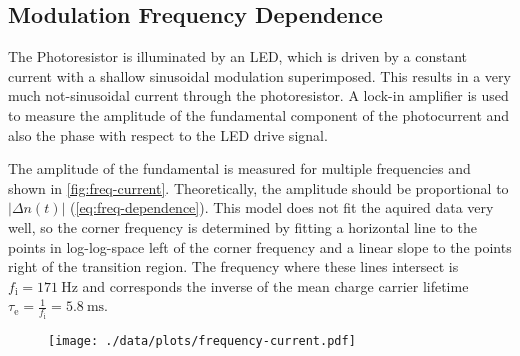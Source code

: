 \subsection{Modulation Frequency Dependence}
The Photoresistor is illuminated by an LED, which is driven by a constant current with a shallow sinusoidal modulation superimposed.
This results in a very much not-sinusoidal current through the photoresistor.
A lock-in amplifier is used to measure the amplitude of the fundamental component of the photocurrent and also the phase with respect to the LED drive signal.

The amplitude of the fundamental is measured for multiple frequencies and shown in \autoref{fig:freq-current}.
Theoretically, the amplitude should be proportional to $|\Delta n(t)|$ (\autoref{eq:freq-dependence}).
This model does not fit the aquired data very well, so the corner frequency is determined by fitting a horizontal line to the points in log-log-space left of the corner frequency and a linear slope to the points right of the transition region.
The frequency where these lines intersect is $f_\text{i} = \SI{171}{\hertz}$ and corresponds the inverse of the mean charge carrier lifetime $\tau_\text{e} = \frac{1}{f_\text{i}} = \SI{5.8}{\milli\second}$.
\begin{figure}
	\centering
	\texttt{[image: ./data/plots/frequency-current.pdf]}
	\label{fig:freq-current}
\end{figure}
